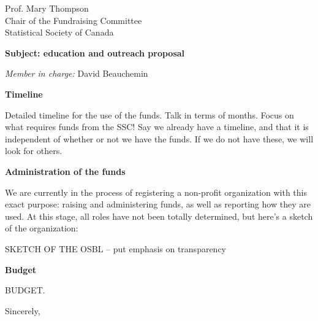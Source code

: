 \documentclass[11pt, a4paper]{letter} %
\begin{document}
\begin{letter}{
	Prof. Mary Thompson\\
	Chair of the Fundraising Committee\\
	Statistical Society of Canada
	
	\bigskip
	\textbf{Subject: education and outreach proposal}%
}
\begin{enumerate}
	\bigskip
	\emph{Member in charge:} David Beauchemin
\end{enumerate}




\noindent \textbf{Timeline}

Detailed timeline for the use of the funds. Talk in terms of months. Focus on what requires funds from the SSC! Say we already have a timeline, and that it is independent of whether or not we have the funds. If we do not have these, we will look for others.


\noindent \textbf{Administration of the funds}

We are currently in the process of registering a non-profit organization with this exact purpose: raising and administering funds, as well as reporting how they are used. At this stage, all roles have not been totally determined, but here's a sketch of the organization:

SKETCH OF THE OSBL -- put emphasis on transparency


\noindent \textbf{Budget}

BUDGET.



%
      
\closing{Sincerely,}




\end{letter}
\end{document}
